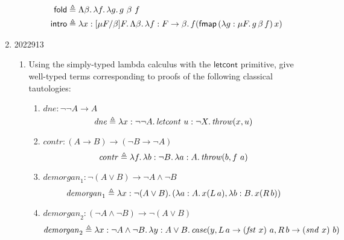 \documentclass[10pt,\jkfside,a4paper]{article}
\newcommand{\letcont}{\ensuremath{\mathsf{letcont}}\xspace}
\begin{document}
\begin{enumerate}
\begin{enumerate}
        \begin{align*}
            \mathsf{fold} &\triangleq \Lambda \beta\ldotp \lambda f\ldotp \lambda g\ldotp g\ \beta\ f \\
            \mathsf{intro} &\triangleq \lambda x: [\mu F / \beta]F\ldotp \Lambda \beta\ldotp \lambda f: F \to \beta \ldotp f(\mathsf{fmap}\, (\lambda g: \mu F\ldotp g\, \beta\, f)\, x)
        \end{align*}

    \end{enumerate}

    \item
    \begin{examquestion}{2022}{9}{13}

        \begin{enumerate}[label=(\alph*)]

            \item Using the simply-typed lambda calculus with the $\letcont$ primitive, give well-typed terms corresponding to proofs of the following classical tautologies:

            \begin{enumerate}[label=(\roman*)]

                \item $\mathit{dne} : \neg \neg A \to A$
                \[
                    \mathit{dne} \triangleq \lambda x: \neg \neg A \ldotp \mathit{letcont}\ u: \neg X\ldotp \mathit{throw}(x, u)
                \]

                \item $\mathit{contr} : (A \to B) \to (\neg B \to \neg A)$
                \[
                    \mathit{contr} \triangleq \lambda f\ldotp \lambda b: \neg B\ldotp \lambda a: A\ldotp \mathit{throw}(b, f\ a)
                \]

                \item $\mathit{demorgan}_1 : \neg (A \vee B) \to \neg A \land \neg B$
                \[
                    \mathit{demorgan}_1 \triangleq \lambda x: \neg (A \vee B) \ldotp (\lambda a: A\ldotp x(L\, a), \lambda b: B\ldotp x(R\, b))
                \]

                \item $\mathit{demorgan}_2 : (\neg A \land \neg B) \to \neg (A \vee B)$
                \[
                    \mathit{demorgan}_2 \triangleq \lambda x: \neg A \land \neg B\ldotp \lambda y: A \vee B\ldotp \mathit{case}(y, L\, a \to (\mathit{fst}\ x)\ a, R\, b \to (\mathit{snd}\ x)\ b)
                \]


\end{enumerate}
\end{enumerate}
\end{examquestion}
\end{enumerate}
\end{document}
